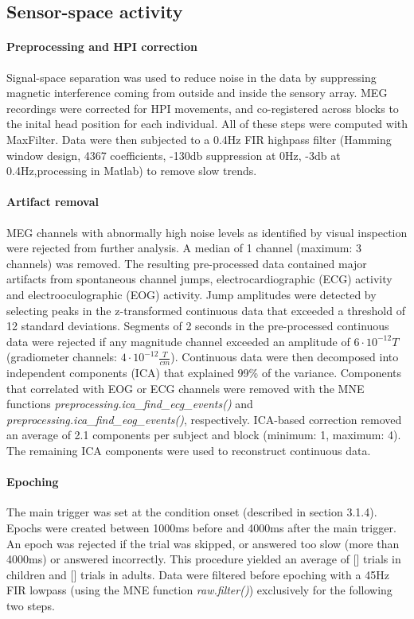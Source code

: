\subsection{Sensor-space activity}

\paragraph{Preprocessing and HPI correction}
Signal-space separation \cite{3.3.SSS} was used to reduce noise in the data by suppressing magnetic interference coming from outside and inside the sensory array.
MEG recordings were corrected for HPI movements, and co-registered across blocks to the inital head position for each individual.
All of these steps were computed with MaxFilter.
Data were then subjected to a 0.4Hz FIR highpass filter (Hamming window design, 4367 coefficients, -130db suppression at 0Hz, -3db at 0.4Hz,processing in Matlab) to remove slow trends.

\paragraph{Artifact removal}
MEG channels with abnormally high noise levels as identified by visual inspection were rejected from further analysis. A median of 1 channel (maximum: 3 channels) was removed.
The resulting pre-processed data contained major artifacts from spontaneous channel jumps, electrocardiographic (ECG) activity and electrooculographic (EOG) activity.
Jump amplitudes were detected by selecting peaks in the z-transformed continuous data that exceeded a threshold of 12 standard deviations.
Segments of 2 seconds in the pre-processed continuous data were rejected if any magnitude channel exceeded an amplitude of $6\cdot10^{-12}T$ (gradiometer channels: $4\cdot10^{-12}\frac{T}{cm}$).
Continuous data were then decomposed into independent components (ICA) that explained 99\% of the variance.
Components that correlated with EOG or ECG channels were removed with the MNE functions \emph{preprocessing.ica\_find\_ecg\_events()} and \emph{preprocessing.ica\_find\_eog\_events()}, respectively.
ICA-based correction removed an average of 2.1 components per subject and block (minimum: 1, maximum: 4).
The remaining ICA components were used to reconstruct continuous data.

\paragraph{Epoching}
The main trigger was set at the condition onset (described in section 3.1.4).
Epochs were created between 1000ms before and 4000ms after the main trigger.
An epoch was rejected if the trial was skipped, or answered too slow (more than 4000ms) or answered incorrectly.
This procedure yielded an average of [] trials in children and [] trials in adults.
Data were filtered before epoching with a 45Hz FIR lowpass (using the MNE function \emph{raw.filter()}) exclusively for the following two steps.

